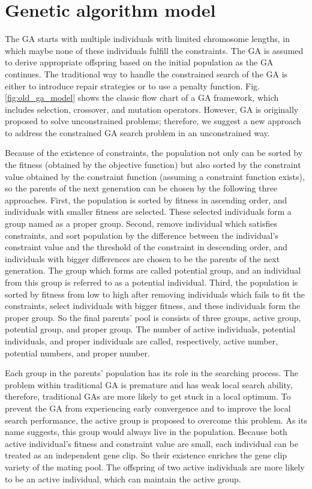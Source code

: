 \section{Genetic algorithm model}



The GA starts with multiple individuals with limited chromosome lengths, in
which maybe none of these individuals fulfill the constraints. The GA is
assumed to derive appropriate offspring based on the initial population as the
GA continues. The traditional way to handle the constrained search of the GA is
either to introduce repair strategies or to use a penalty function. Fig.
\ref{fig:old_ga_model} shows the classic flow chart of a GA framework, which
includes selection, crossover, and mutation operators. However, GA is originally
proposed to solve unconstrained problems; therefore, we suggest a new approach 
to address the constrained GA search problem in an unconstrained way. 

Because of the existence of constraints, the population not only can be sorted
by the fitness (obtained by the objective function) but also sorted by
the constraint value obtained by the constraint function (assuming a constraint
function exists), so the parents of the next generation can be chosen by the
following three approaches. First, the population is sorted by fitness in
ascending order, and individuals with smaller fitness are selected. These
selected individuals form a group named as a proper group. Second, remove
individual which satisfies constraints, and sort population by the difference
between the individual's constraint value and the threshold of the constraint
in descending order, and individuals with bigger differences are chosen to be
the parents of the next generation. The group which forms are called potential
group, and an individual from this group is referred to as a potential
individual.  Third, the population is sorted by fitness from low to high after
removing individuals which fails to fit the constraints, select individuals
with bigger fitness, and these individuals form the proper group.  So the final
parents' pool is consists of three groups, active group, potential group, and
proper group.  The number of active individuals, potential individuals, and
proper individuals are called, respectively, active number, potential numbers,
and proper number. 

Each group in the parents' population has its role in the searching
process. The problem within traditional GA is premature and has weak local
search ability, therefore, traditional GAs are more likely to get stuck in a
local optimum. To prevent the GA from experiencing early convergence and to
improve the local search performance, the active group is proposed to overcome
this problem. As its name suggests, this group would always live in the
population.  Because both active individual's fitness and constraint value are small,
each individual can be treated as an independent gene clip. So their existence
enriches the gene clip variety of the mating pool. The offspring of two active
individuals are more likely to be an active individual, which can maintain the
active group.


